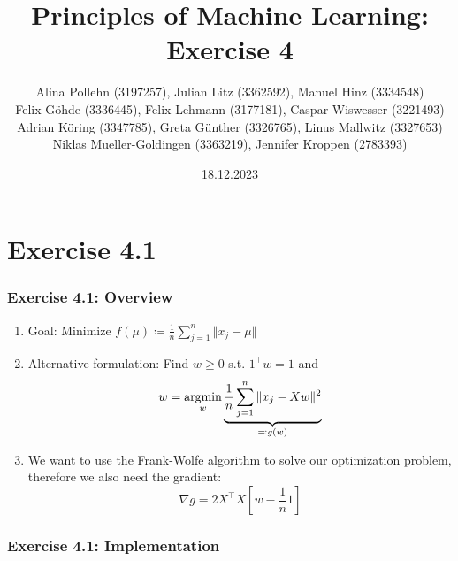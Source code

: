 \documentclass[10pt,aspectratio=169,handout]{beamer}
\begin{document}
\title{Principles of Machine Learning: Exercise 4}
\date{18.12.2023}
\author{Alina Pollehn (3197257), Julian Litz (3362592), Manuel Hinz (3334548)\\
    Felix Göhde (3336445), Felix Lehmann (3177181), Caspar Wiswesser (3221493)\\
    Adrian Köring (3347785), Greta Günther (3326765), Linus Mallwitz (3327653)\\
    Niklas Mueller-Goldingen (3363219), Jennifer Kroppen (2783393)}

\begin{frame}
    \maketitle
\end{frame}

\section{Exercise 4.1}

\begin{frame}

    \frametitle{Exercise 4.1: Overview}

    \begin{enumerate}
        \item Goal: Minimize $f(\mu)\coloneqq \frac{1}{n}\sum_{j=1}^{n} \Vert x_j-\mu\Vert$
        \item Alternative formulation: Find $w\geq 0$ s.t. $1^\intercal w=1$ and \[w=\operatorname*{argmin}_w\underbrace{\frac{1}{n}\sum_{j=1}^n \Vert x_j - Xw \Vert^2}_{\eqqcolon g(w)}\]
        \item We want to use the Frank-Wolfe algorithm to solve our optimization problem, therefore we also need the gradient: \[\nabla g = 2 X^\intercal X [w-\frac{1}{n}1]\]
    \end{enumerate}

\end{frame}

\begin{frame}
    \frametitle{Exercise 4.1: Implementation}

    \inputminted[bgcolor=LightGray,fontsize=\small]{python}{code/ex4-1.py}

\end{frame}
\end{document}
